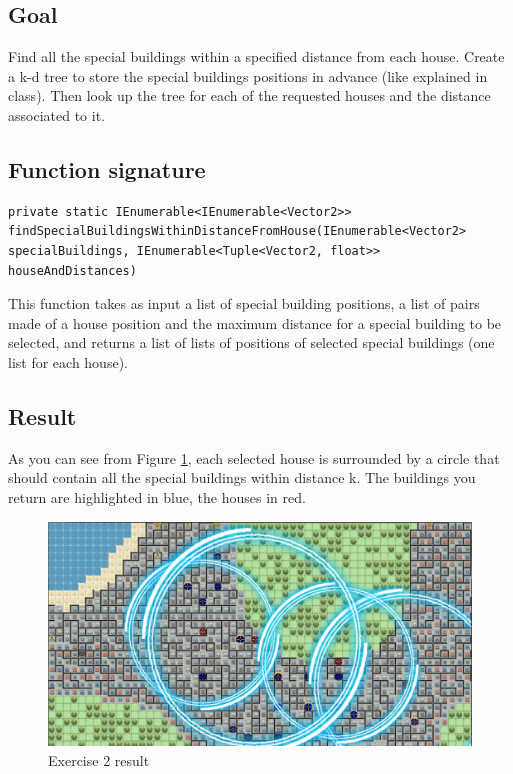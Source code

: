 \documentclass[10pt,a4paper]{article}
\begin{document}
\subsection*{Goal}
Find all the special buildings within a specified distance from each house. Create a k-d tree to store the special buildings positions in advance (like explained in class). Then look up the tree for each of the requested houses and the distance associated to it.

\subsection*{Function signature} 
\begin{lstlisting}
private static IEnumerable<IEnumerable<Vector2>> findSpecialBuildingsWithinDistanceFromHouse(IEnumerable<Vector2> specialBuildings, IEnumerable<Tuple<Vector2, float>> houseAndDistances)
\end{lstlisting}

\noindent
This function takes as input a list of special building positions, a list of pairs made of a house position and the maximum distance for a special building to be selected, and returns a list of lists of positions of selected special buildings (one list for each house).

\subsection*{Result}
As you can see from Figure \ref{img:Ex2}, each selected house is surrounded by a circle that should contain all the special buildings within distance k. The buildings you return are highlighted in blue, the houses in red.

\begin{figure}[!h]
\centering
\includegraphics[scale=0.25]{img/exercise2}
\caption{Exercise 2 result}
\label{img:Ex2}
\end{figure}
\end{document}
